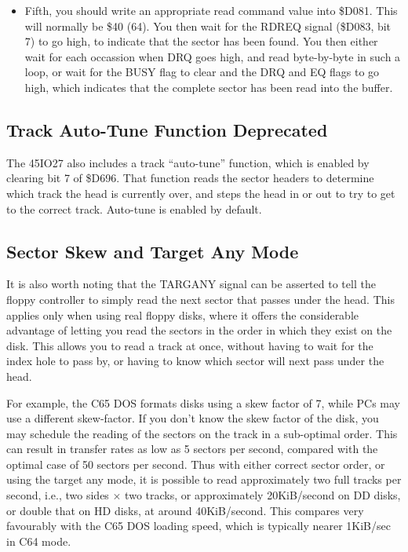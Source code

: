 \begin{itemize}
\item Fifth, you should write an appropriate read command
value into \$D081.  This will normally be \$40 (64).  You then wait
for the RDREQ signal (\$D083, bit 7) to go high, to indicate that the
sector has been found. You then either wait for each occassion when
DRQ goes high, and read byte-by-byte in such a loop, or wait for the
BUSY flag to clear and the DRQ and EQ flags to go high, which indicates
that the complete sector has been read into the buffer.

\end{itemize}

\subsection{Track Auto-Tune Function Deprecated}

The 45IO27 also includes a track ``auto-tune'' function, which is enabled
by clearing bit 7 of \$D696.  That function reads the sector headers to
determine which track the head is currently over, and steps the head in or
out to try to get to the correct track. Auto-tune is enabled by default.

\subsection{Sector Skew and Target Any Mode}

It is also worth noting that the TARGANY signal can be asserted to
tell the floppy controller to simply read the next sector that passes
under the head.  This applies only when using real floppy disks, where
it offers the considerable advantage of letting you read the sectors
in the order in which they exist on the disk. This allows you to read
a track at once, without having to wait for the index hole to pass by,
or having to know which sector will next pass under the head.

For example,
the C65 DOS formats disks using a skew factor of 7, while PCs may use
a different skew-factor. If you don't know the skew factor of the disk,
you may schedule the reading of the sectors on the track in a sub-optimal
order. This can result in transfer rates as low as 5 sectors per second,
compared with the optimal case of 50 sectors per second.
Thus with either correct sector order, or using the target any mode,
it is possible to read approximately two full tracks per second,
i.e., two sides $\times$ two tracks, or approximately 20KiB/second on
DD disks, or double that on HD disks, at around 40KiB/second.  This
compares very favourably with the C65 DOS loading speed, which is
typically nearer 1KiB/sec in C64 mode.


